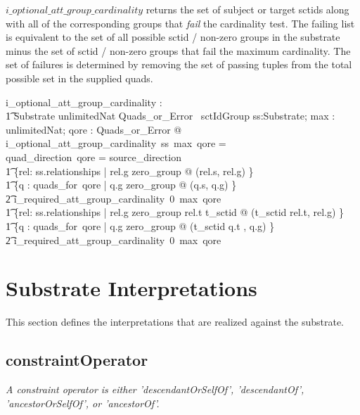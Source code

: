 \documentclass{article}
\def\desc#1{{\small \textsl{{#1}} }}
\begin{document}
$i\_optional\_att\_group\_cardinality$ returns the set of subject or target sctids along with all of the corresponding groups that \emph{fail} the cardinality test.  The failing list
is equivalent to the set of all possible sctid / non-zero groups in the substrate minus the set of sctid / non-zero groups that fail the maximum cardinality. The set of failures is determined by removing the set of passing tuples from the total possible set in the supplied quads.
\begin{gendef}
   i\_optional\_att\_group\_cardinality : \\
\t1 Substrate \fun unlimitedNat \fun Quads\_or\_Error \ \fun \power sctIdGroup
\where
   \forall ss:Substrate; max : unlimitedNat; qore : Quads\_or\_Error  @ \\
i\_optional\_att\_group\_cardinality~ss~max~qore = \\
\IF quad\_direction~qore = source\_direction \THEN \\
\t1  \{rel: ss.relationships | rel.g \neq zero\_group @ (rel.s, rel.g) \} \setminus \\
\t1 \{q : quads\_for~qore | q.g \neq zero\_group @ (q.s, q.g) \} \cup \\
\t2 i\_required\_att\_group\_cardinality~0~max~qore
\also
\ELSE \\
\t1  \{rel: ss.relationships | rel.g \neq zero\_group \land rel.t \in \ran t\_sctid @ (t\_sctid \inv rel.t, rel.g) \} \setminus \\
\t1 \{q : quads\_for~qore | q.g \neq zero\_group @ (t\_sctid \inv q.t , q.g) \}  \cup \\
\t2 i\_required\_att\_group\_cardinality~0~max~qore
\end{gendef}



\section{Substrate Interpretations}
\label{sect:substrate}
This section defines the interpretations that are realized against the substrate. 

\subsection{constraintOperator}
\begin{framed}
\desc{A constraint operator is either 'descendantOrSelfOf', 'descendantOf', 'ancestorOrSelfOf', or 'ancestorOf'.}
\end{framed}
\end{document}
